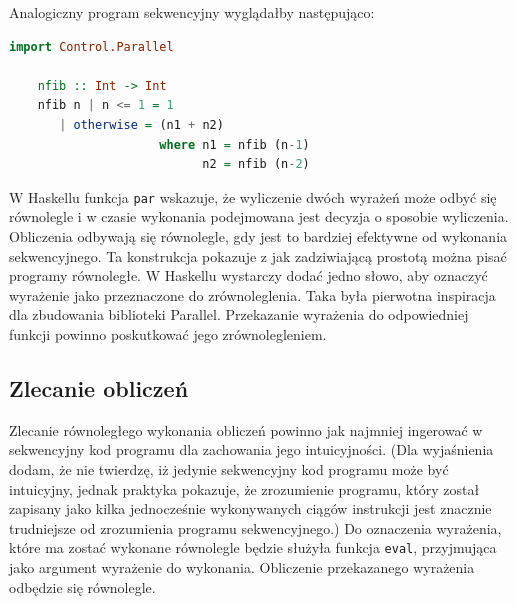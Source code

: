   Analogiczny program sekwencyjny wyglądałby następująco:
  \begin{lstlisting}[language=Haskell]
    import Control.Parallel

    nfib :: Int -> Int
    nfib n | n <= 1 = 1
       | otherwise = (n1 + n2)
                     where n1 = nfib (n-1)
                           n2 = nfib (n-2)
  \end{lstlisting}
  
  W Haskellu funkcja \verb|par| wskazuje, że wyliczenie dwóch wyrażeń może odbyć się równolegle i w czasie wykonania podejmowana jest decyzja o sposobie wyliczenia.
  Obliczenia odbywają się równolegle, gdy jest to bardziej efektywne od wykonania sekwencyjnego.
  Ta konstrukcja pokazuje z jak zadziwiającą prostotą można pisać programy równoległe.
  W Haskellu wystarczy dodać jedno słowo, aby oznaczyć wyrażenie jako przeznaczone do zrównoleglenia.
  Taka była pierwotna inspiracja dla zbudowania biblioteki Parallel.
  Przekazanie wyrażenia do odpowiedniej funkcji powinno poskutkować jego zrównolegleniem.
  
\subsection{Zlecanie obliczeń}\label{ss:zlecanie}


  Zlecanie równoległego wykonania obliczeń powinno jak najmniej ingerować w sekwencyjny kod programu dla zachowania jego intuicyjności.
  (Dla wyjaśnienia dodam, że nie twierdzę, iż jedynie sekwencyjny kod programu może być intuicyjny, jednak praktyka pokazuje, że zrozumienie programu, 
  który został zapisany jako kilka jednocześnie wykonywanych ciągów instrukcji jest znacznie trudniejsze od zrozumienia programu sekwencyjnego.)
  Do oznaczenia wyrażenia, które ma zostać wykonane równolegle będzie służyła funkcja \verb|eval|, przyjmująca jako argument wyrażenie do wykonania.
  Obliczenie przekazanego wyrażenia odbędzie się równolegle.
  
